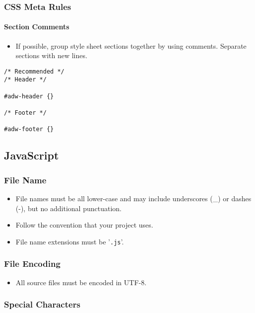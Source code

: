 \documentclass[a4paper, 11pt]{article}
\begin{document}
\subsubsection{CSS Meta Rules}

\paragraph{Section Comments}
\begin{itemize}
\item If possible, group style sheet sections together by using comments. Separate sections with new lines.
\end{itemize}
\begin{verbatim}
/* Recommended */
/* Header */

#adw-header {}

/* Footer */

#adw-footer {}
\end{verbatim}

\pagebreak

\subsection{JavaScript}
\subsubsection{File Name}
\begin{itemize}
\item File names must be all lower-case and may include underscores (\_) or dashes (-), but no additional punctuation.
\item Follow the convention that your project uses. 
\item File name extensions must be '\texttt{.js}'.
\end{itemize}

\subsubsection{File Encoding}
\begin{itemize}
\item All source files must be encoded in UTF-8.
\end{itemize}

\subsubsection{Special Characters}
\end{document}
